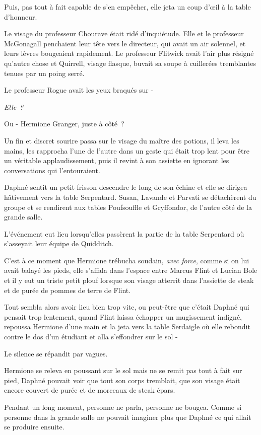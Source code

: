 Puis, pas tout à fait capable de s'en empêcher, elle jeta un coup d'œil à la table d'honneur.

Le visage du professeur Chourave était ridé d'inquiétude. Elle et le professeur McGonagall penchaient leur tête vers le directeur, qui avait un air solennel, et leurs lèvres bougeaient rapidement. Le professeur Flitwick avait l'air plus résigné qu'autre chose et Quirrell, visage flasque, buvait sa soupe à cuillerées tremblantes tenues par un poing serré.

Le professeur Rogue avait les yeux braqués sur -

\emph{Elle~?}

Ou - Hermione Granger, juste à côté~?

Un fin et discret sourire passa sur le visage du maître des potions, il leva les mains, les rapprocha l'une de l'autre dans un geste qui était trop lent pour être un véritable applaudissement, puis il revint à son assiette en ignorant les conversations qui l'entouraient.

Daphné sentit un petit frisson descendre le long de son échine et elle se dirigea hâtivement vers la table Serpentard. Susan, Lavande et Parvati se détachèrent du groupe et se rendirent aux tables Poufsouffle et Gryffondor, de l'autre côté de la grande salle.

L'événement eut lieu lorsqu'elles passèrent la partie de la table Serpentard où s'asseyait leur équipe de Quidditch.

C'est à ce moment que Hermione trébucha soudain, \emph{avec force}, comme si on lui avait balayé les pieds, elle s'affala dans l'espace entre Marcus Flint et Lucian Bole et il y eut un triste petit plouf lorsque son visage atterrit dans l'assiette de steak et de purée de pommes de terre de Flint.

Tout sembla alors avoir lieu bien trop vite, ou peut-être que c'était Daphné qui pensait trop lentement, quand Flint laissa échapper un mugissement indigné, repoussa Hermione d'une main et la jeta vers la table Serdaigle où elle rebondit contre le dos d'un étudiant et alla s'effondrer sur le sol -

Le silence se répandit par vagues.

Hermione se releva en poussant sur le sol mais ne se remit pas tout à fait sur pied, Daphné pouvait voir que tout son corps tremblait, que son visage était encore couvert de purée et de morceaux de steak épars.

Pendant un long moment, personne ne parla, personne ne bougea. Comme si personne dans la grande salle ne pouvait imaginer plus que Daphné ce qui allait se produire ensuite.

